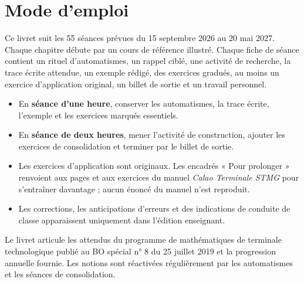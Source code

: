 \chapter*{Mode d'emploi}
Ce livret suit les 55 séances prévues du 15 septembre 2026 au 20 mai 2027. Chaque chapitre débute par un cours de référence illustré. Chaque fiche de séance contient un rituel d'automatismes, un rappel ciblé, une activité de recherche, la trace écrite attendue, un exemple rédigé, des exercices gradués, au moins un exercice d'application original, un billet de sortie et un travail personnel.

\begin{itemize}
\item En \textbf{séance d'une heure}, conserver les automatismes, la trace écrite, l'exemple et les exercices marqués essentiels.
\item En \textbf{séance de deux heures}, mener l'activité de construction, ajouter les exercices de consolidation et terminer par le billet de sortie.
\item Les exercices d'application sont originaux. Les encadrés « Pour prolonger » renvoient aux pages et aux exercices du manuel \emph{Calao Terminale STMG} pour s'entraîner davantage ; aucun énoncé du manuel n'est reproduit.
\item Les corrections, les anticipations d'erreurs et des indications de conduite de classe apparaissent uniquement dans l'édition enseignant.
\end{itemize}

\begin{keypoint}
Le livret articule les attendus du programme de mathématiques de terminale technologique publié au BO spécial n° 8 du 25 juillet 2019 et la progression annuelle fournie. Les notions sont réactivées régulièrement par les automatismes et les séances de consolidation.
\end{keypoint}

\tableofcontents
